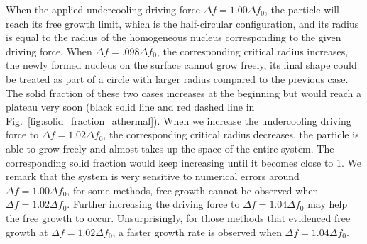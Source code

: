 \documentclass[preprint,12pt]{elsarticle}
\begin{document}
When the applied undercooling driving force $\Delta f=1.00\Delta f_0$, the particle will reach its free growth limit, which is the half-circular configuration, and its radius is equal to the radius of the homogeneous nucleus corresponding to the given driving force.  When $\Delta f=.098\Delta f_0$, the corresponding critical radius increases, the newly formed nucleus on the surface cannot grow freely, its final shape could be treated as part of a circle with larger radius compared to the previous case. The solid fraction of these two cases increases at the beginning but would reach a plateau very soon (black solid line and red dashed line in Fig.~\ref{fig:solid_fraction_athermal}).  When we increase the undercooling driving force to $\Delta f=1.02\Delta f_0$, the corresponding critical radius decreases, the particle is able to grow freely and almost takes up the space of the entire system. The corresponding solid fraction would keep increasing until it becomes close to 1. We remark that the system is very sensitive to numerical errors around $\Delta f=1.00\Delta f_0$, for some methods, free growth cannot be observed when $\Delta f=1.02\Delta f_0$. Further increasing the driving force to $\Delta f=1.04\Delta f_0$ may help the free growth to occur. Unsurprisingly, for those methods that evidenced free growth at $\Delta f=1.02\Delta f_0$, a faster growth rate is observed when $\Delta f=1.04\Delta f_0$.
\end{document}
